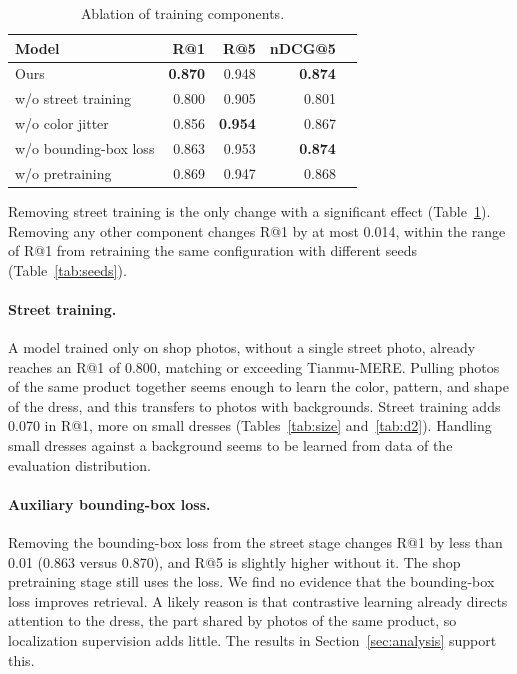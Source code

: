 \documentclass[sigconf,nonacm]{acmart}
\begin{document}
\begin{table}[t]
  \caption{Ablation of training components.}
  \label{tab:ablation}
  \small
  \begin{tabular}{lrrrr}
    \toprule
    Model & R@1 & R@5 & nDCG@5 \\
    \midrule
    Ours & \textbf{0.870} & 0.948 & \textbf{0.874} \\
    w/o street training & 0.800 & 0.905 & 0.801 \\
    w/o color jitter & 0.856 & \textbf{0.954} & 0.867 \\
    w/o bounding-box loss & 0.863 & 0.953 & \textbf{0.874} \\
    w/o pretraining & 0.869 & 0.947 & 0.868 \\
    \bottomrule
  \end{tabular}
\end{table}

Removing street training is the only change with a significant effect (Table~\ref{tab:ablation}). Removing any other component changes R@1 by at most 0.014, within the range of R@1 from retraining the same configuration with different seeds (Table~\ref{tab:seeds}).

\paragraph{Street training.} A model trained only on shop photos, without a single street photo, already reaches an R@1 of 0.800, matching or exceeding Tianmu-MERE. Pulling photos of the same product together seems enough to learn the color, pattern, and shape of the dress, and this transfers to photos with backgrounds. Street training adds 0.070 in R@1, more on small dresses (Tables~\ref{tab:size} and~\ref{tab:d2}). Handling small dresses against a background seems to be learned from data of the evaluation distribution.

\paragraph{Auxiliary bounding-box loss.} Removing the bounding-box loss from the street stage changes R@1 by less than 0.01 (0.863 versus 0.870), and R@5 is slightly higher without it. The shop pretraining stage still uses the loss. We find no evidence that the bounding-box loss improves retrieval. A likely reason is that contrastive learning already directs attention to the dress, the part shared by photos of the same product, so localization supervision adds little. The results in Section~\ref{sec:analysis} support this.
\end{document}
